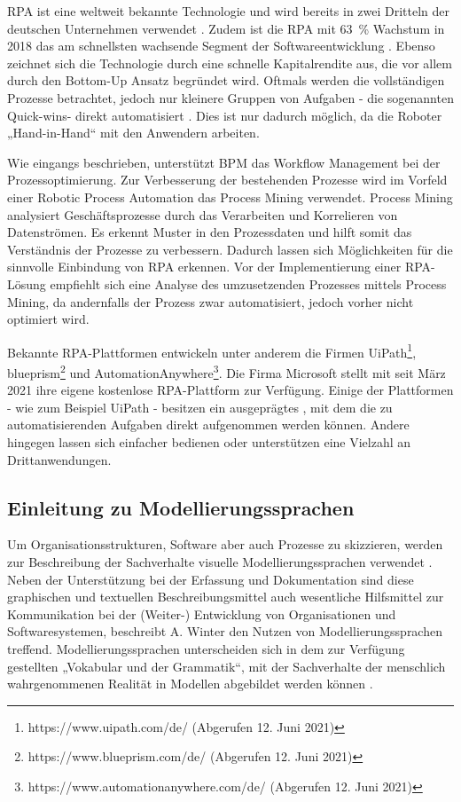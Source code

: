 RPA ist eine weltweit bekannte Technologie und wird bereits in zwei Dritteln der deutschen Unternehmen verwendet \cite{isgRPA} \cite{pwcRPA}. Zudem ist die RPA mit 63~\% Wachstum in 2018 das am schnellsten wachsende Segment der Softwareentwicklung \cite{gartner}. Ebenso zeichnet sich die Technologie durch eine schnelle Kapitalrendite aus, die vor allem durch den Bottom-Up Ansatz begründet wird. \glqq Oftmals werden die vollständigen Prozesse betrachtet, jedoch nur kleinere Gruppen von Aufgaben - die sogenannten \frqq Quick-wins\flqq - direkt automatisiert \cite{aalstYoutube}.\grqq{} Dies ist nur dadurch möglich, da die Roboter „Hand-in-Hand“ mit den Anwendern arbeiten. 

Wie eingangs beschrieben, unterstützt BPM das Workflow Management bei der Prozessoptimierung. Zur Verbesserung der bestehenden Prozesse wird im Vorfeld einer Robotic Process Automation das Process Mining verwendet. Process Mining analysiert Geschäftsprozesse durch das Verarbeiten und Korrelieren von Datenströmen. Es erkennt Muster in den Prozessdaten und hilft somit das Verständnis der Prozesse zu verbessern. Dadurch lassen sich Möglichkeiten für die sinnvolle Einbindung von RPA erkennen. Vor der Implementierung einer RPA-Lösung empfiehlt sich eine Analyse des umzusetzenden Prozesses mittels Process Mining, da andernfalls der Prozess zwar automatisiert, jedoch vorher nicht optimiert wird. 

Bekannte RPA-Plattformen entwickeln unter anderem die Firmen \mbox{UiPath}\footnote{https://www.uipath.com/de/ (Abgerufen 12. Juni 2021)}, \mbox{blueprism}\footnote{https://www.blueprism.com/de/ (Abgerufen 12. Juni 2021)} und \mbox{AutomationAnywhere}\footnote{https://www.automationanywhere.com/de/ (Abgerufen 12. Juni 2021)}. Die Firma Microsoft stellt mit  seit März 2021 ihre eigene kostenlose RPA-Plattform zur Verfügung. Einige der Plattformen - wie zum Beispiel UiPath - besitzen ein ausgeprägtes , mit dem die zu automatisierenden Aufgaben direkt aufgenommen werden können. Andere hingegen lassen sich  einfacher bedienen oder unterstützen eine Vielzahl an Drittanwendungen. 

\subsection{Einleitung zu Modellierungssprachen}

Um Organisationsstrukturen, Software aber auch Prozesse zu skizzieren, werden zur Beschreibung der Sachverhalte visuelle Modellierungssprachen verwendet \cite{winter2000}. \glqq Neben der Unterstützung bei der Erfassung und Dokumentation sind diese graphischen und textuellen Beschreibungsmittel auch wesentliche Hilfsmittel zur Kommunikation bei der (Weiter-) Entwicklung von Organisationen und Softwaresystemen\grqq{}, beschreibt A. Winter den Nutzen von Modellierungssprachen treffend. Modellierungssprachen unterscheiden sich in dem zur Verfügung gestellten „Vokabular und der Grammatik“, mit der Sachverhalte der menschlich wahrgenommenen Realität in Modellen abgebildet werden können \cite{Fleischmann2018}.

